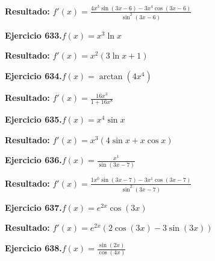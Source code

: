 \documentclass[10pt,a4paper]{article}
\begin{document}
\begin{solbox}
\textbf{Resultado:} \(\displaystyle f'(x) = \frac{4x^{3}\sin(3x -6) - 3x^{4}\cos(3x -6)}{\sin^2(3x -6)}\)
\end{solbox}

\begin{ejbox}
\textbf{Ejercicio 633.}\quad $f(x) = x^{3} \ln x$
\end{ejbox}

\begin{solbox}
\textbf{Resultado:} \(\displaystyle f'(x) = x^{2}(3\ln x + 1)\)
\end{solbox}

\newpage
\begin{ejbox}
\textbf{Ejercicio 634.}\quad $f(x) = \arctan(4x^{4})$
\end{ejbox}

\begin{solbox}
\textbf{Resultado:} \(\displaystyle f'(x) = \frac{16x^{3}}{1+16x^{8}}\)
\end{solbox}

\begin{ejbox}
\textbf{Ejercicio 635.}\quad $f(x) = x^{4} \sin x$
\end{ejbox}

\begin{solbox}
\textbf{Resultado:} \(\displaystyle f'(x) = x^{3}(4\sin x + x\cos x)\)
\end{solbox}

\begin{ejbox}
\textbf{Ejercicio 636.}\quad $f(x) = \frac{x^{1}}{\sin(3x -7)}$
\end{ejbox}

\begin{solbox}
\textbf{Resultado:} \(\displaystyle f'(x) = \frac{1x^{0}\sin(3x -7) - 3x^{1}\cos(3x -7)}{\sin^2(3x -7)}\)
\end{solbox}

\newpage
\begin{ejbox}
\textbf{Ejercicio 637.}\quad $f(x) = e^{2x} \cos(3x)$
\end{ejbox}

\begin{solbox}
\textbf{Resultado:} \(\displaystyle f'(x) = e^{2x}(2\cos(3x) - 3\sin(3x))\)
\end{solbox}

\begin{ejbox}
\textbf{Ejercicio 638.}\quad $f(x) = \frac{\sin(2x)}{\cos(4x)}$
\end{ejbox}
\end{document}

